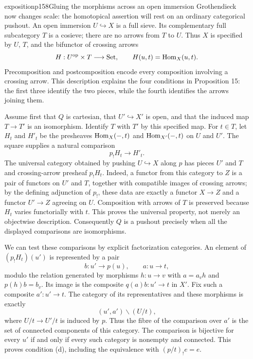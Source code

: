 \begin{dcomment}{exposition}{p158}{Gluing the morphisms across an open immersion}
Grothendieck now changes scale: the homotopical assertion will rest on an ordinary categorical pushout. An open immersion $U\hookrightarrow X$ is a full sieve. Its complementary full subcategory $T$ is a cosieve; there are no arrows from $T$ to $U$. Thus $X$ is specified by $U$, $T$, and the bifunctor of crossing arrows
\[
       H:U^{\mathrm{op}}\times T\longrightarrow\mathrm{Set},
       \qquad H(u,t)=\mathrm{Hom}_X(u,t).
\]
Precomposition and postcomposition encode every composition involving a crossing arrow. This description explains the four conditions in Proposition 15: the first three identify the two pieces, while the fourth identifies the arrows joining them.

Assume first that $Q$ is cartesian, that $U'\hookrightarrow X'$ is open, and that the induced map $T\to T'$ is an isomorphism. Identify $T$ with $T'$ by this specified map. For $t\in T$, let $H_t$ and $H'_t$ be the presheaves $\mathrm{Hom}_X(-,t)$ and $\mathrm{Hom}_{X'}(-,t)$ on $U$ and $U'$. The square supplies a natural comparison
\[
                  p_!H_t\longrightarrow H'_t.
\]
The universal category obtained by pushing $U\hookrightarrow X$ along $p$ has pieces $U'$ and $T$ and crossing-arrow presheaf $p_!H_t$. Indeed, a functor from this category to $Z$ is a pair of functors on $U'$ and $T$, together with compatible images of crossing arrows; by the defining adjunction of $p_!$, these data are exactly a functor $X\to Z$ and a functor $U'\to Z$ agreeing on $U$. Composition with arrows of $T$ is preserved because $H_t$ varies functorially with $t$. This proves the universal property, not merely an objectwise description. Consequently $Q$ is a pushout precisely when all the displayed comparisons are isomorphisms.

We can test these comparisons by explicit factorization categories. An element of $(p_!H_t)(u')$ is represented by a pair
\[
       b:u'\longrightarrow p(u),\qquad a:u\longrightarrow t,
\]
modulo the relation generated by morphisms $h:u\to v$ with $a=a_vh$ and $p(h)b=b_v$. Its image is the composite $q(a)b:u'\to t$ in $X'$. Fix such a composite $a':u'\to t$. The category of its representatives and these morphisms is exactly
\[
        (u',a')\backslash(U/t),
\]
where $U/t\to U'/t$ is induced by $p$. Thus the fibre of the comparison over $a'$ is the set of connected components of this category. The comparison is bijective for every $u'$ if and only if every such category is nonempty and connected. This proves condition (d), including the equivalence with $(p/t)_!e=e$.


\end{dcomment}

